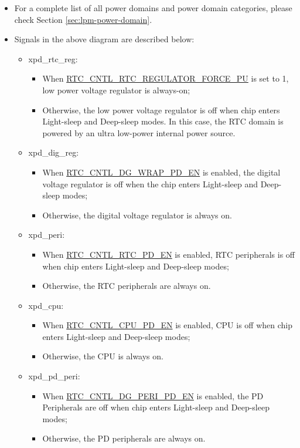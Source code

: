 \documentclass[main\_\_EN.tex]{subfiles}
\begin{document}
\clearpage
\begin{tiplisting}
\begin{itemize}
\vspace{-3em}
    \item For a complete list of all power domains and power domain categories, please check Section \ref{sec:lpm-power-domain}.
    \item Signals in the above diagram are described below:
    \begin{itemize}
        \item xpd\_rtc\_reg:
        \begin{itemize}
            \item When \hyperref[fielddesc:RTCCNTLRTCREGULATORFORCEPU]{RTC\_CNTL\_RTC\_REGULATOR\_FORCE\_PU} is set to 1, low power voltage regulator is always-on;
            \item Otherwise, the low power voltage regulator is off when chip enters Light-sleep and Deep-sleep modes. In this case, the RTC domain is powered by an ultra low-power internal power source.
        \end{itemize}
        \item xpd\_dig\_reg:
        \begin{itemize}
            \item When \hyperref[fielddesc:RTCCNTLDGWRAPPDEN]{RTC\_CNTL\_DG\_WRAP\_PD\_EN} is enabled, the digital voltage regulator is off when the chip enters Light-sleep and Deep-sleep modes;
            \item Otherwise, the digital voltage regulator is always on.
        \end{itemize}
        \item xpd\_peri:
        \begin{itemize}
            \item When \hyperref[fielddesc:RTCCNTLDGWRAPPDEN]{RTC\_CNTL\_RTC\_PD\_EN} is enabled, RTC peripherals is off when chip enters Light-sleep and Deep-sleep modes;
            \item Otherwise, the RTC peripherals are always on.
        \end{itemize}

        \item xpd\_cpu:
        \begin{itemize}
            \item When \hyperref[fielddesc:RTCCNTLDGWRAPPDEN]{RTC\_CNTL\_CPU\_PD\_EN} is enabled, CPU is off when chip enters Light-sleep and Deep-sleep modes;
            \item Otherwise, the CPU is always on.
        \end{itemize}
        \item xpd\_pd\_peri:
        \begin{itemize}
            \item When \hyperref[fielddesc:RTCCNTLDGWRAPPDEN]{RTC\_CNTL\_DG\_PERI\_PD\_EN} is enabled, the PD Peripherals are off when chip enters Light-sleep and Deep-sleep modes;
            \item Otherwise, the PD peripherals are always on.
        \end{itemize}


\end{itemize}
\end{itemize}
\end{tiplisting}
\end{document}
